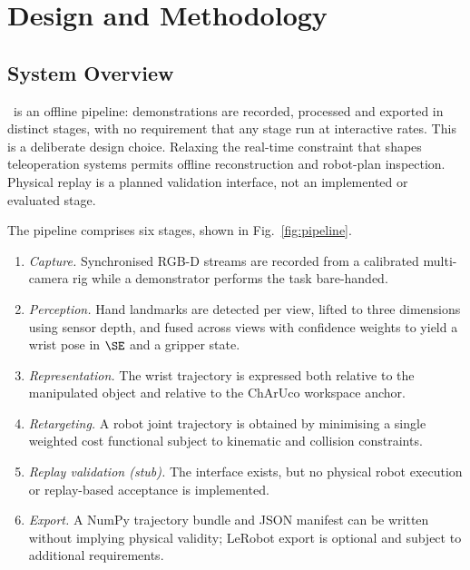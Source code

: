 \chapter{Design and Methodology}
\label{ch:method}

\section{System Overview}
\label{sec:overview}

\viki\ is an offline pipeline: demonstrations are recorded, processed and
exported in distinct stages, with no requirement that any stage run at
interactive rates. This is a deliberate design choice. Relaxing the real-time
constraint that shapes teleoperation systems permits offline reconstruction
and robot-plan inspection. Physical replay is a planned validation interface,
not an implemented or evaluated stage.

The pipeline comprises six stages, shown in Fig.~\ref{fig:pipeline}.

\begin{enumerate}[leftmargin=2em]
  \item \emph{Capture.} Synchronised RGB-D streams are recorded from a
        calibrated multi-camera rig while a demonstrator performs the task
        bare-handed.
  \item \emph{Perception.} Hand landmarks are detected per view, lifted to
        three dimensions using sensor depth, and fused across views with
        confidence weights to yield a wrist pose in $\SE$ and a gripper state.
  \item \emph{Representation.} The wrist trajectory is expressed both relative
        to the manipulated object and relative to the ChArUco workspace anchor.
  \item \emph{Retargeting.} A robot joint trajectory is obtained by minimising
        a single weighted cost functional subject to kinematic and collision
        constraints.
  \item \emph{Replay validation (stub).} The interface exists, but no physical
        robot execution or replay-based acceptance is implemented.
  \item \emph{Export.} A NumPy trajectory bundle and JSON manifest can be
        written without implying physical validity; LeRobot export is optional
        and subject to additional requirements.
\end{enumerate}

